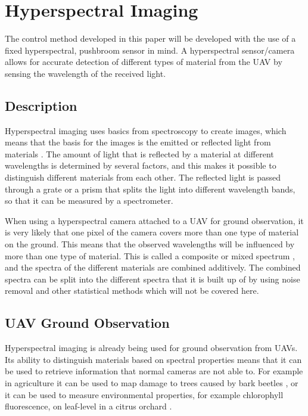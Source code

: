 \section{Hyperspectral Imaging}
\label{sec:hyper}

The control method developed in this paper will be developed with the use of a fixed hyperspectral, pushbroom sensor in mind. A hyperspectral sensor/camera allows for accurate detection of different types of material from the UAV by sensing the wavelength of the received light.


\subsection{Description}

Hyperspectral imaging uses basics from spectroscopy to create images, which means that the basis for the images is the emitted or reflected light from materials \cite{hypSMITH}. The amount of light that is reflected by a material at different wavelengths is determined by several factors, and this makes it possible to distinguish different materials from each other. The reflected light is passed through a grate or a prism that splits the light into different wavelength bands, so that it can be measured by a spectrometer.

When using a hyperspectral camera attached to a UAV for ground observation, it is very likely that one pixel of the camera covers more than one type of material on the ground. This means that the observed wavelengths will be influenced by more than one type of material. This is called a composite or mixed spectrum \cite{hypSMITH}, and the spectra of the different materials are combined additively. The combined spectra can be split into the different spectra that it is built up of by using noise removal and other statistical methods which will not be covered here.


\subsection{UAV Ground Observation}

Hyperspectral imaging is already being used for ground observation from UAVs. Its ability to distinguish materials based on spectral properties means that it can be used to retrieve information that normal cameras are not able to. For example in agriculture it can be used to map damage to trees caused by bark beetles \cite{beetleNASI}, or it can be used to measure environmental properties, for example chlorophyll fluorescence, on leaf-level in a citrus orchard \cite{waterStressBERNI}.

